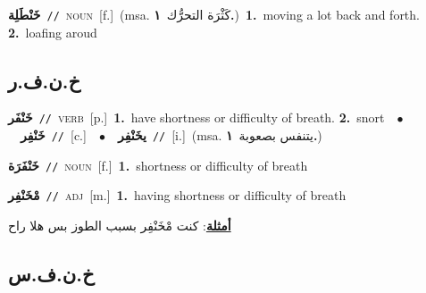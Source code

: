 \documentclass[10pt,a4paper,twoside]{article} %
\begin{document}
\begin{multicols}{2}
{\setlength\topsep{0pt}\textbf{\foreignlanguage{arabic}{خَنْطَلِة}}\ {\color{gray}\texttt{//}\color{black}}\ \textsc{noun}\ [f.]\ \color{gray}(msa. \foreignlanguage{arabic}{كَثْرَة التحرُّك}~\foreignlanguage{arabic}{\textbf{١.}})\color{black}\ \textbf{1.}~moving a lot back and forth.  \textbf{2.}~loafing aroud\ } \vspace{2mm}

\vspace{-3mm}
\subsection*{\color{blue}\foreignlanguage{arabic}{خ.ن.ف.ر}\color{blue}{}} 

{\setlength\topsep{0pt}\textbf{\foreignlanguage{arabic}{خَنْفَر}}\ {\color{gray}\texttt{//}\color{black}}\ \textsc{verb}\ [p.]\ \textbf{1.}~have shortness or difficulty of breath.  \textbf{2.}~snort\ \ $\bullet$\ \ \setlength\topsep{0pt}\textbf{\foreignlanguage{arabic}{خَنْفِر}}\ {\color{gray}\texttt{//}\color{black}}\ [c.]\ \ $\bullet$\ \ \setlength\topsep{0pt}\textbf{\foreignlanguage{arabic}{يخَنْفِر}}\ {\color{gray}\texttt{//}\color{black}}\ [i.]\ \color{gray}(msa. \foreignlanguage{arabic}{يتنفس بصعوبة}~\foreignlanguage{arabic}{\textbf{١.}})\color{black}\ } \vspace{2mm}

{\setlength\topsep{0pt}\textbf{\foreignlanguage{arabic}{خَنْفَرَة}}\ {\color{gray}\texttt{//}\color{black}}\ \textsc{noun}\ [f.]\ \textbf{1.}~shortness or difficulty of breath\ } \vspace{2mm}

{\setlength\topsep{0pt}\textbf{\foreignlanguage{arabic}{مْخَنْفِر}}\ {\color{gray}\texttt{//}\color{black}}\ \textsc{adj}\ [m.]\ \textbf{1.}~having shortness or difficulty of breath\  \begin{flushright}\color{gray}\foreignlanguage{arabic}{\textbf{\underline{\foreignlanguage{arabic}{أمثلة}}}: كنت مْخَنْفِر بسبب الطوز بس هلا راح}\end{flushright}\color{black}} \vspace{2mm}

\vspace{-3mm}
\subsection*{\color{blue}\foreignlanguage{arabic}{خ.ن.ف.س}\color{blue}{}} 


\end{multicols}
\end{document}
